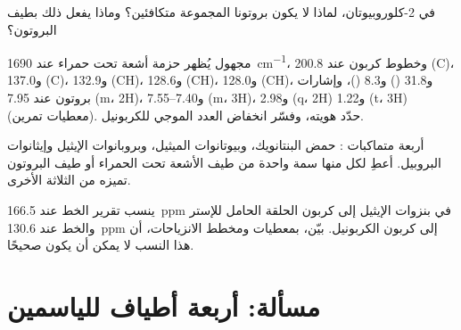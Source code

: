 \begin{exercise}[$\star\star$]\label{exo:b2:structure-determination:9}
في 2-كلوروبيوتان، لماذا لا يكون بروتونا المجموعة  متكافئين؟ وماذا يفعل ذلك
بطيف البروتون؟
\end{exercise}

\begin{exercise}[$\star\star\star$]\label{exo:b2:structure-determination:10}
مجهول  يُظهر حزمة أشعة تحت حمراء عند \qty{1690}{cm^{-1}}، وخطوط كربون عند 200.8 (C)، و137.0 (C)،
و132.9 (CH)، و128.6 (CH)، و128.0 (CH)، و31.8 () و8.3 ()، وإشارات بروتون عند 7.95 (m،
2H)، و7.40--7.55 (m، 3H)، و2.98 (q، 2H) و1.22 (t، 3H) (معطيات تمرين). حدّد هويته، وفسّر
انخفاض العدد الموجي للكربونيل.
\end{exercise}

\begin{exercise}[$\star\star\star$]\label{exo:b2:structure-determination:11}
أربعة متماكبات : حمض البنتانويك، وبيوتانوات الميثيل، وبروبانوات الإيثيل وإيثانوات البروبيل.
أعطِ لكل منها سمة واحدة من طيف الأشعة تحت الحمراء أو طيف البروتون تميزه من الثلاثة الأخرى.
\end{exercise}

\begin{exercise}[$\star\star\star$]\label{exo:b2:structure-determination:12}
ينسب تقرير الخط عند 166.5~ppm في بنزوات الإيثيل إلى كربون الحلقة الحامل للإستر 
والخط عند 130.6~ppm إلى كربون الكربونيل. بيّن، بمعطيات  ومخطط الانزياحات، أن هذا
النسب لا يمكن أن يكون صحيحًا.
\end{exercise}

\section{مسألة: أربعة أطياف للياسمين}

